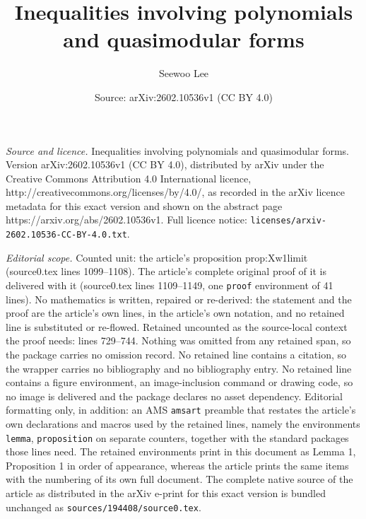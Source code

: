 \documentclass[10pt,a4paper]{amsart}
\title{Inequalities involving polynomials and quasimodular forms}
\author{Seewoo Lee}
\date{Source: arXiv:2602.10536v1 (CC BY 4.0)}
\begin{document}
\maketitle

\noindent\emph{Source and licence.} Inequalities involving polynomials and quasimodular forms. Version arXiv:2602.10536v1 (CC BY 4.0), distributed by arXiv under the Creative Commons Attribution 4.0 International licence, http://creativecommons.org/licenses/by/4.0/, as recorded in the arXiv licence metadata for this exact version and shown on the abstract page https://arxiv.org/abs/2602.10536v1. Full licence notice: \texttt{licenses/arxiv-2602.10536-CC-BY-4.0.txt}.\par\smallskip

\noindent\textit{Editorial scope.} Counted unit: the article's proposition prop:Xw1limit (source0.tex lines 1099--1108). The article's complete original proof of it is delivered with it (source0.tex lines 1109--1149, one \texttt{proof} environment of 41 lines). No mathematics is written, repaired or re-derived: the statement and the proof are the article's own lines, in the article's own notation, and no retained line is substituted or re-flowed.  Retained uncounted as the source-local context the proof needs: lines 729--744.  Nothing was omitted from any retained span, so the package carries no omission record.  No retained line contains a citation, so the wrapper carries no bibliography and no bibliography entry.  No retained line contains a figure environment, an image-inclusion command or drawing code, so no image is delivered and the package declares no asset dependency.  Editorial formatting only, in addition: an AMS \texttt{amsart} preamble that restates the article's own declarations and macros used by the retained lines, namely the environments \texttt{lemma}, \texttt{proposition} on separate counters, together with the standard packages those lines need.  The retained environments print in this document as Lemma 1, Proposition 1 in order of appearance, whereas the article prints the same items with the numbering of its own full document.  The complete native source of the article as distributed in the arXiv e-print for this exact version is bundled unchanged as \texttt{sources/194408/source0.tex}.
\end{document}
